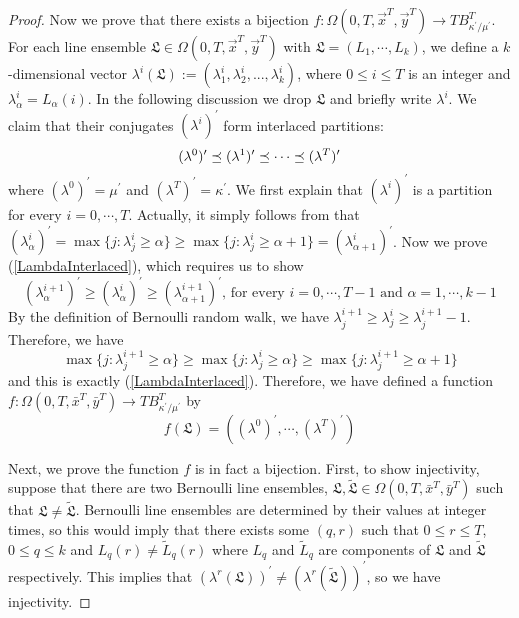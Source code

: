 \begin{proof}
Now we prove that there exists a bijection $f:\Omega(0,T,\vec{x}^T,\vec{y}^{T})\rightarrow TB_{\kappa^{\prime}/\mu^{\prime}}^{T}$. For each line ensemble $\mathfrak{L}\in \Omega(0,T,\vec x^T,\vec y^T)$ with $\mathfrak{L}=(L_1,\cdots,L_k)$, we define a $k$-dimensional vector $\lambda^{i}(\mathfrak{L}):=(\lambda_{1}^{i},\lambda_{2}^{i},...,\lambda_{k}^{i})$, where $0 \leq i\leq T$ is an integer and $\lambda_{\alpha}^{i}=L_{\alpha}(i)$. In the following discussion we drop $\mathfrak{L}$ and briefly write $\lambda^{i}$. We claim that their conjugates $(\lambda^{i})^{\prime}$ form interlaced partitions:
\begin{equation}{\label{LambdaInterlaced}}
	(\lambda^{0})^{\prime}\preceq(\lambda^{1})^{\prime}\preceq\cdots\preceq(\lambda^{T})^{\prime}
\end{equation}
where $\left(\lambda^{0}\right)^{\prime}=\mu^{\prime}$ and $\left(\lambda^{T}\right)^{\prime}=\kappa^{\prime}$. We first explain that $(\lambda^{i})^{\prime}$ is a partition for every $i=0,\cdots,T$. Actually, it simply follows from that $(\lambda^{i}_{\alpha})^{\prime}=\max\{j:\lambda_{j}^{i}\geq \alpha\}\geq \max\{j:\lambda_{j}^{i}\geq \alpha+1\}=(\lambda^{i}_{\alpha+1})^{\prime}$. Now we prove (\ref{LambdaInterlaced}), which requires us to show
\begin{equation*}
	(\lambda^{i+1}_{\alpha})^{\prime}\geq (\lambda^{i}_{\alpha})^{\prime}\geq (\lambda^{i+1}_{\alpha+1})^{\prime}\text{, for every } i=0,\cdots, T-1 \text{ and }\alpha=1,\cdots, k-1 
\end{equation*}
By the definition of Bernoulli random walk, we have $\lambda_{j}^{i+1}\geq\lambda_{j}^{i}\geq\lambda_{j}^{i+1}-1$. Therefore, we have 
\begin{equation*}
	\max\{j:\lambda_{j}^{i+1}\geq \alpha\}\geq\max\{j:\lambda_{j}^{i}\geq \alpha\}\geq\max\{j:\lambda_{j}^{i+1}\geq \alpha+1\}
\end{equation*}
and this is exactly (\ref{LambdaInterlaced}).
Therefore, we have defined a function $f:\Omega(0,T,\bar x^T, \bar y ^T)\to TB_{\kappa^{\prime}/\mu^{\prime}}^T$ by
\begin{equation}
	f(\mathfrak{L})=\left((\lambda^{0})^{\prime},\cdots,(\lambda^{T})^{\prime}\right)
\end{equation}

Next, we prove the function $f$ is in fact a bijection. First, to show injectivity, suppose that there are two Bernoulli line ensembles, $\mathfrak{L}, \widetilde{\mathfrak{L}}\in \Omega(0,T,\bar x^T, \bar y ^T)$ such that $\mathfrak{L}\neq \widetilde{\mathfrak{L}}$.
Bernoulli line ensembles are determined by their values at integer times, so this would imply that there exists some $(q,r)$ such that $0\leq r\leq T$, $0\leq q \leq k$ and $L_q(r)\neq \widetilde{L}_q(r)$ where $L_q$ and $\widetilde{L}_q$ are components of $\mathfrak{L}$ and $\widetilde{\mathfrak{L}}$ respectively. This implies that $\left(\lambda^r(\mathfrak{L})\right)^{\prime}\neq \left(\lambda^r(\widetilde{\mathfrak{L}})\right)^{\prime}$, so we have injectivity. 


\end{proof}
